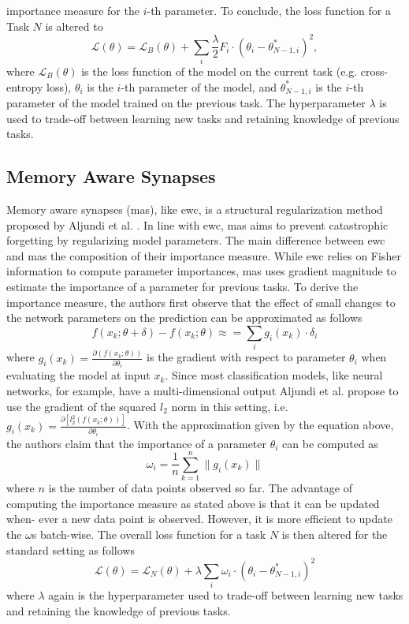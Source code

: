 importance measure for the $i$-th parameter. To conclude, the loss function for a Task $N$ is altered to
\begin{equation}
    \mathcal{L}(\theta) = \mathcal{L}_B(\theta) + \sum_i \frac{\lambda}{2} F_i \cdot (\theta_i - \theta^*_{N-1,i})^2,
\end{equation}
where $\mathcal{L}_B(\theta)$ is the loss function of the model on the current task (e.g. cross-entropy loss), $\theta_i$ is the $i$-th parameter of the model,
and $\theta^*_{N-1,i}$ is the $i$-th parameter of the model trained on the previous task. The hyperparameter $\lambda$ is used to trade-off between
learning new tasks and retaining knowledge of previous tasks.

\subsection{Memory Aware Synapses}
\label{sec:Related_work:Continual_Learning:MAS}
Memory aware synapses (\gls{mas}), like \gls{ewc}, is a structural regularization method proposed by Aljundi et al. \cite{aljundi2018memory}. 
In line with \gls{ewc}, \gls{mas} aims to prevent catastrophic forgetting by regularizing model parameters. The main difference between \gls{ewc} and
\gls{mas} the composition of their importance measure. While \gls{ewc} relies on Fisher information to compute parameter importances, \gls{mas} uses
gradient magnitude to estimate the importance of a parameter for previous tasks. To derive the importance measure, the authors first observe that the
effect of small changes to the network parameters on the prediction can be approximated as follows
\begin{equation}
    f(x_k; \theta + \delta) - f(x_k; \theta) \approx = \sum_i g_i(x_k) \cdot \delta_i
\end{equation}
where $g_i(x_k) = \frac{\partial(f(x_k;\theta))}{\partial \theta_i}$  is the gradient with respect to parameter $\theta_i$ when evaluating the model at
input $x_k$. Since most classification models, like neural networks, for example, have a multi-dimensional output Aljundi et al. propose to use the gradient
of the squared $l_2$ norm in this setting, i.e. $g_i(x_k) =  \frac{\partial[l^2_2(f(x_k;\theta))]}{\partial \theta_i}$. With the approximation given by the
equation above, the authors claim that the importance of a parameter $\theta_i$ can be computed as
\begin{equation}
    \omega_i = \frac{1}{n} \sum_{k=1}^n \lVert g_i(x_k) \rVert
\end{equation}
where $n$ is the number of data points observed so far. The advantage of computing the importance measure as stated above is that it can be updated when-
ever a new data point is observed. However, it is more efficient to update the $\omega$s batch-wise. The overall loss function for a task $N$ is
then altered for the standard setting as follows
\begin{equation}
    \mathcal{L}(\theta) = \mathcal{L}_N(\theta) + \lambda \sum_i \omega_i \cdot (\theta_i - \theta^*_{N-1,i})^2
\end{equation}
where $\lambda$ again is the hyperparameter used to trade-off between learning new tasks and retaining the knowledge of previous tasks.

